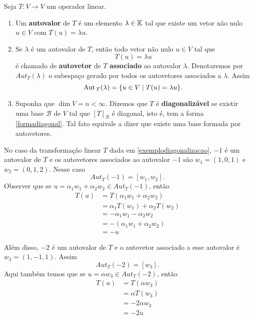 \begin{definicao}
    Seja $T : V \to V$ um operador linear.
    \begin{enumerate}[label={\roman*})]
        \item Um \textbf{autovalor} de $T$ \'e um elemento $\lambda \in \mathbb{K}$ tal que existe um vetor n\~ao nulo $u \in V$ com $T(u) = \lambda u$.
        \item Se $\lambda$ \'e um autovalor de $T$, ent\~ao todo vetor n\~ao nulo $u \in V$ tal que
        \[
            T(u) = \lambda u
        \]
        \'e chamado de \textbf{autovetor} de $T$ \textbf{associado} ao autovalor $\lambda$. Denotaremos por $Aut_T(\lambda)$ o subespa\c{c}o gerado por todos os autovetores associados a $\lambda$. Assim
        \[
            {\rm Aut\,}_T(\lambda) = \{u \in V \mid T(u) = \lambda u\}.
        \]
        \item Suponha que $\dim V = n < \infty$. Dizemos que $T$ \'e \textbf{diagonaliz\'avel} se existir uma base $\mathcal{B}$ de $V$ tal que $[T]_\mathcal{B}$ \'e diagonal, isto \'e, tem a forma \eqref{formadiagonal}. Tal fato equivale a dizer que existe uma base formada por autovetores.
    \end{enumerate}
\end{definicao}

\begin{exemplo}
    No caso da transformação linear $T$ dada em \eqref{exemplodiagonalizacao}, $-1$ é um autovalor de $T$ e os autovetores associados ao autovalor $-1$ são $w_1 = (1, 0, 1)$ e $w_2 = (0, 1, 2)$. Nesse caso
    \[
        Aut_T(-1) = [w_1, w_2].
    \]
    Observer que se $u = \alpha_1w_1 + \alpha_2w_2 \in Aut_T(-1)$, então
    \begin{align*}
        T(u) &= T(\alpha_1w_1 + \alpha_2w_2) \\ &= \alpha_1T(w_1) + \alpha_2T(w_2) \\ &= -\alpha_1w_1 - \alpha_2w_2 \\ &= -(\alpha_1w_1 + \alpha_2w_2) \\ &= -u
    \end{align*}

    Além disso, $-2$ é um autovalor de $T$ e o autovetor associado a esse autovalor é $w_3 = (1, -1, 1)$. Assim
    \[
        Aut_T(-2) = [w_3].
    \]
    Aqui também temos que se $u = \alpha w_3 \in Aut_T(-2)$, então
    \begin{align*}
        T(u) &= T(\alpha w_3) \\ &= \alpha T(w_3) \\ &= -2\alpha w_3 \\ &= -2u
    \end{align*}
\end{exemplo}

